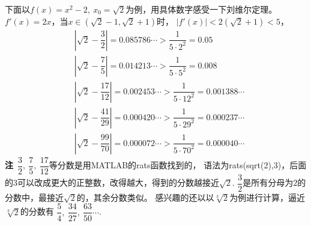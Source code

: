 \begin{itemize}[leftmargin=\inteval{\myitemleftmargin}pt,itemsep=
   \inteval{\myitemitempsep}pt,topsep=\inteval{\myitemtopsep}pt]
下面以$ f(x)=x^2-2,\ x_0=\sqrt{2} $为例，用具体数字感受一下刘维尔定理。
$ f'(x)=2x $，当$ x\in(\sqrt{2}-1,\sqrt{2}+1) $时，
$ |f'(x)|<2(\sqrt{2}+1)<5 $，
\begin{align*}
    & \left|\sqrt{2} -\dfrac{3}{2}\right|=0.085786\cdots >\dfrac{1}{5\cdot 2^2}=0.05  \\
    & \left|\sqrt{2} -\dfrac{7}{5}\right|=0.014213\cdots >\dfrac{1}{5\cdot 5^2}=0.008  \\
    & \left|\sqrt{2} -\dfrac{17}{12}\right|=0.002453\cdots >\dfrac{1}{5\cdot 12^2}=0.001388\cdots  \\
    & \left|\sqrt{2} -\dfrac{41}{29}\right|=0.000420\cdots >\dfrac{1}{5\cdot 29^2}=0.000237\cdots  \\
    & \left|\sqrt{2} -\dfrac{99}{70}\right|=0.000072\cdots >\dfrac{1}{5\cdot 70^2}=0.000040\cdots 
\end{align*}
\textbf{注}\ $ \dfrac{3}{2},\ \dfrac{7}{5},\ \dfrac{17}{12} $等分数是用MATLAB的rats函数找到的，
语法为rats(sqrt(2),3)，后面的3可以改成更大的正整数，改得越大，得到的分数越接近$ \sqrt{2} $.
$ \dfrac{3}{2} $是所有分母为$ 2 $的分数中，最接近$ \sqrt{2} $的，其余分数类似。
感兴趣的还以以$ \sqrt[3]{2} $为例进行计算，逼近$ \sqrt[3]{2} $的分数有
$ \dfrac{5}{4},\ \dfrac{34}{27},\ \dfrac{63}{50}\cdots $. 

\end{itemize}

